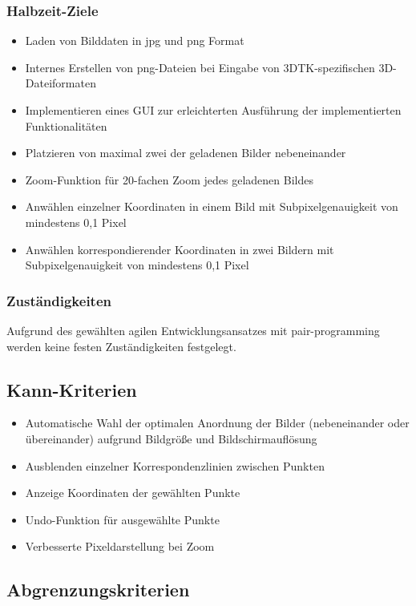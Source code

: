 \documentclass[a4paper,10pt]{scrartcl}
\begin{document}
\subsubsection{Halbzeit-Ziele}
\begin{itemize}
\item Laden von Bilddaten in jpg und png Format
\item Internes Erstellen von png-Dateien bei Eingabe von 3DTK-spezifischen 3D-Dateiformaten
\item Implementieren eines GUI zur erleichterten Ausführung der implementierten Funktionalitäten
\item Platzieren von maximal zwei der geladenen Bilder nebeneinander
\item Zoom-Funktion für 20-fachen Zoom jedes geladenen Bildes
\item Anwählen einzelner Koordinaten in einem Bild mit Subpixelgenauigkeit von mindestens 0,1 Pixel
\item Anwählen korrespondierender Koordinaten in zwei Bildern mit Subpixelgenauigkeit von mindestens 0,1 Pixel
    
\end{itemize}
\newpage

\subsubsection{Zuständigkeiten}
Aufgrund des gewählten agilen Entwicklungsansatzes mit pair-programming werden keine festen Zuständigkeiten festgelegt. 

\subsection{Kann-Kriterien}

\begin{itemize}
    \item Automatische Wahl der optimalen Anordnung der Bilder (nebeneinander oder übereinander) aufgrund Bildgröße und Bildschirmauflösung
    \item Ausblenden einzelner Korrespondenzlinien zwischen Punkten
    \item Anzeige Koordinaten der gewählten Punkte
    \item Undo-Funktion für ausgewählte Punkte
    \item Verbesserte Pixeldarstellung bei Zoom
\end{itemize}

\subsection{Abgrenzungskriterien}
\end{document}
